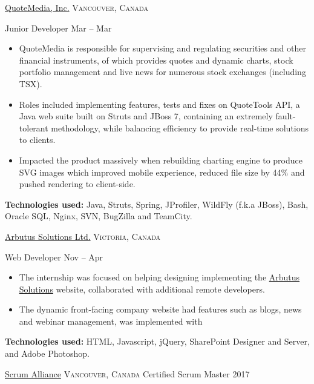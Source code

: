 \documentclass[10pt,a4paper]{article}
\begin{document}
\headedsection  %
  {\href{https://www.quotemedia.com/}{QuoteMedia, Inc.}}
  {\textsc{Vancouver, Canada}} {
  \headedsubsection
    {Junior Developer}
    {Mar  -- Mar }
    {\noindent\begin{itemize}  
\item QuoteMedia is responsible for supervising and regulating securities and other financial instruments, of which provides quotes and dynamic charts, stock portfolio management and live news for numerous stock exchanges (including TSX).
\item Roles included implementing features, tests and fixes on QuoteTools API, a Java web suite built on Struts and JBoss 7, containing an extremely
fault-tolerant methodology, while balancing efficiency to provide real-time solutions to clients.
\item Impacted the product massively when rebuilding charting engine to produce SVG images which improved mobile
experience, reduced file size by 44\% and pushed rendering to client-side.
\end{itemize}
\textbf{Technologies used:} Java, Struts, Spring, JProfiler, WildFly (f.k.a JBoss), Bash, Oracle SQL, Nginx, SVN, BugZilla and TeamCity. }
}

\headedsection  %
  {\href{http://arbutussolutions.com/}{Arbutus Solutions Ltd.}}
  {\textsc{Victoria, Canada}} {
  \headedsubsection
    {Web Developer}
    {Nov  -- Apr }
    {\noindent\begin{itemize}   
\item The internship was focused on helping designing implementing the \href{http://arbutussolutions.com/}{Arbutus Solutions} website, collaborated with additional remote developers.
\item The dynamic front-facing company website had features such as blogs, news and webinar management, was implemented with
\end{itemize}
\textbf{Technologies used:} HTML, Javascript, jQuery, SharePoint Designer and Server, and Adobe Photoshop.}
}

\vspace{1em}
\spacedhrule{0em}{-0.4em}

\headedsection
  {\href{https://www.scrumalliance.org/}{Scrum Alliance}}
  {\textsc{Vancouver, Canada}} {
  \headedsubsection
    {Certified Scrum Master}
    {2017}
    {}
}
\end{document}
